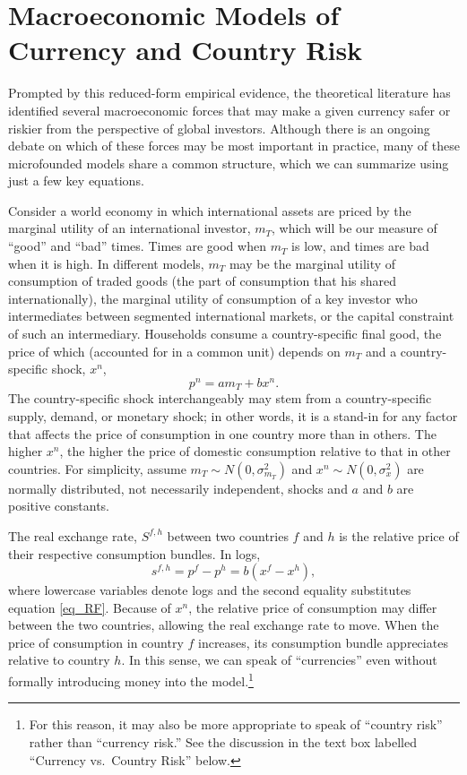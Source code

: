 \documentclass{ar-1col}
\begin{document}
\section{Macroeconomic Models of Currency and Country Risk\label{sec_theory}}

Prompted by this reduced-form empirical evidence, the theoretical literature has identified several macroeconomic forces that may make a given currency safer or riskier from the perspective of global investors. Although there is an ongoing debate on which of these forces may be most important in practice, many of these microfounded models share a common structure, which we can summarize using just a few key equations.

Consider a world economy in which international assets are priced by the marginal utility of an international investor, $m_T$, which will be our measure of ``good'' and ``bad'' times. Times are good when $m_T$ is low, and times are bad when it is high. In different models, $m_T$ may be the marginal utility of consumption of traded goods (the part of consumption that his shared internationally), the marginal utility of consumption of a key investor who intermediates between segmented international markets, or the capital constraint of such an intermediary. Households consume a country-specific final good, the price of which (accounted for in a common unit) depends on $m_T$ and a country-specific shock, $x^n$,
\begin{equation}
  p^{n} = a m_T + b x^{n}.  
  \label{eq_RF}
\end{equation}%
The country-specific shock interchangeably may stem from a country-specific supply, demand, or monetary shock; in other words, it is a stand-in for any factor that affects the price of consumption in one country more than in others. The higher $x^{n}$, the higher the price of domestic consumption relative to that in other countries. For simplicity, assume $m_{T} \sim N(0, \sigma^2_{m_{T}})$ and $x^{n} \sim N(0,\sigma^2_x) $ are normally distributed, not necessarily independent, shocks and $a$ and $b$ are positive constants.

The real exchange rate, $S^{f, h}$ between two countries $f$ and $h$ is the relative price of their respective consumption bundles. In logs,
\begin{equation}
  s^{f,h} 
  = p^f - p^h 
  = b(x^f - x^h),
\label{eq_RER}
\end{equation}
where lowercase variables denote logs and the second equality substitutes equation \ref{eq_RF}. Because of $x^{n}$, the relative price of consumption may differ between the two countries, allowing the real exchange rate to move. When the price of consumption in country $f$ increases, its consumption bundle appreciates relative to country $h$. In this sense, we can speak of ``currencies'' even without formally introducing money into the model.\footnote{For this reason, it may also be more appropriate to speak of ``country risk'' rather than ``currency risk.'' See the discussion in the text box labelled ``Currency vs.~Country Risk'' below. }
\end{document}
